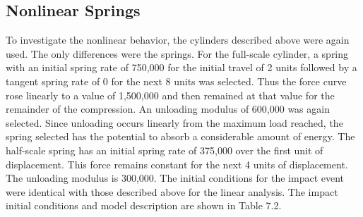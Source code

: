 \subsection{Nonlinear Springs}

     To investigate the nonlinear behavior, the cylinders described
above were again used.  The only differences were the springs.  For
the full-scale cylinder,
a spring with an initial spring rate of 750,000 for
the initial travel of 2 units
followed by a tangent spring rate of 0 for the
next 8 units
was selected.  Thus the force curve rose linearly to a value of
1,500,000
and then remained at that value for the remainder of the
compression.  An unloading modulus of 600,000 was again selected.
Since unloading occurs linearly from the maximum load reached, the
spring selected has the potential to absorb a considerable amount of
energy.  The half-scale spring has an initial spring rate of 375,000
over the first unit
of displacement. This force remains constant for the
next 4 units of displacement.  The unloading modulus is 300,000.  The
initial conditions for the impact event were identical with those
described above for the linear analysis.  The impact initial
conditions and model description are shown in Table 7.2.


